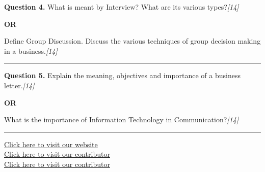 \documentclass[11pt,a4paper]{article}
\newcommand{\pts}[1]{\hfill   \textit{[#1]}}
\begin{document}
\noindent   \textbf{Question 4.}
What is meant by Interview? What are its various types?\pts{14}

\centerline{   \textbf{OR}}

Define Group Discussion. Discuss the various techniques of group decision making in a business.\pts{14}

\medskip\rule{\linewidth}{0.2pt}




\noindent   \textbf{Question 5.}
Explain the meaning, objectives and importance of a business letter.\pts{14}

\centerline{   \textbf{OR}}

What is the importance of Information Technology in Communication?\pts{14}

\vfill
\rule{\linewidth}{0.4pt}

\begin{center}\small
\href{https://bhu-exam.vercel.app/}{Click here to visit our website}\\[4pt]
\href{https://me-aryan.vercel.app/}{Click here to visit our contributor}\\[4pt]
\href{https://quashan-me.vercel.app/}{Click here to visit our contributor}
\end{center}
\end{document}

